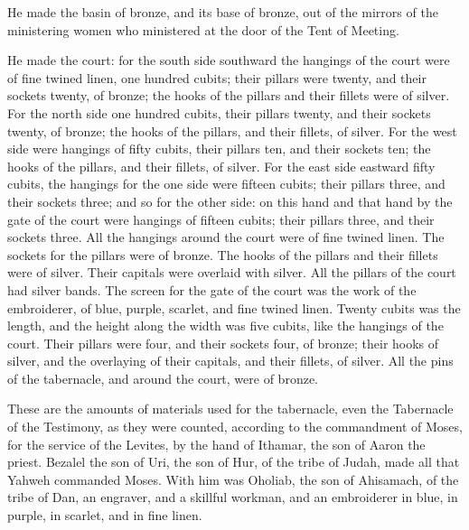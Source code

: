 He made the basin of bronze, and its base of bronze, out
of the mirrors of the ministering women who ministered at the door of
the Tent of Meeting.

 He made the court: for the south side southward the
hangings of the court were of fine twined linen, one hundred cubits;
 their pillars were twenty, and their sockets twenty, of
bronze; the hooks of the pillars and their fillets were of silver.
 For the north side one hundred cubits, their pillars
twenty, and their sockets twenty, of bronze; the hooks of the pillars,
and their fillets, of silver.  For the west side were
hangings of fifty cubits, their pillars ten, and their sockets ten; the
hooks of the pillars, and their fillets, of silver.  For
the east side eastward fifty cubits,  the hangings for
the one side were fifteen cubits; their pillars three, and their sockets
three;  and so for the other side: on this hand and that
hand by the gate of the court were hangings of fifteen cubits; their
pillars three, and their sockets three.  All the hangings
around the court were of fine twined linen.  The sockets
for the pillars were of bronze. The hooks of the pillars and their
fillets were of silver. Their capitals were overlaid with silver. All
the pillars of the court had silver bands.  The screen
for the gate of the court was the work of the embroiderer, of blue,
purple, scarlet, and fine twined linen. Twenty cubits was the length,
and the height along the width was five cubits, like the hangings of the
court.  Their pillars were four, and their sockets four,
of bronze; their hooks of silver, and the overlaying of their capitals,
and their fillets, of silver.  All the pins of the
tabernacle, and around the court, were of bronze.

 These are the amounts of materials used for the
tabernacle, even the Tabernacle of the Testimony, as they were counted,
according to the commandment of Moses, for the service of the Levites,
by the hand of Ithamar, the son of Aaron the priest. 
Bezalel the son of Uri, the son of Hur, of the tribe of Judah, made all
that Yahweh commanded Moses.  With him was Oholiab, the
son of Ahisamach, of the tribe of Dan, an engraver, and a skillful
workman, and an embroiderer in blue, in purple, in scarlet, and in fine
linen.

